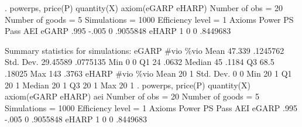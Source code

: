 . powerps, price(P) quantity(X) axiom(eGARP eHARP)
{\smallskip}
                       Number of obs           =        20 
                       Number of goods         =         5 
                       Simulations             =      1000 
                       Efficiency level        =         1 
{\smallskip}
      Axioms {\VBAR}     Power         PS       Pass        AEI 
       eGARP {\VBAR}      .995      -.005          0   .9055848 
       eHARP {\VBAR}         1          0          0   .8449683 
 
Summary statistics for simulations:
{\smallskip}
       eGARP {\VBAR}      \#vio       \%vio 
        Mean {\VBAR}    47.339   .1245762 
   Std. Dev. {\VBAR}  29.45589   .0775135 
         Min {\VBAR}         0          0 
          Q1 {\VBAR}        24      .0632 
      Median {\VBAR}        45      .1184 
          Q3 {\VBAR}      68.5     .18025 
         Max {\VBAR}       143      .3763 
{\smallskip}
       eHARP {\VBAR}      \#vio       \%vio 
        Mean {\VBAR}        20          1 
   Std. Dev. {\VBAR}         0          0 
         Min {\VBAR}        20          1 
          Q1 {\VBAR}        20          1 
      Median {\VBAR}        20          1 
          Q3 {\VBAR}        20          1 
         Max {\VBAR}        20          1 
{\smallskip}
. powerps, price(P) quantity(X) axiom(eGARP eHARP) aei
{\smallskip}
                       Number of obs           =        20 
                       Number of goods         =         5 
                       Simulations             =      1000 
                       Efficiency level        =         1 
{\smallskip}
      Axioms {\VBAR}     Power         PS       Pass        AEI 
       eGARP {\VBAR}      .995      -.005          0   .9055848 
       eHARP {\VBAR}         1          0          0   .8449683 
 
